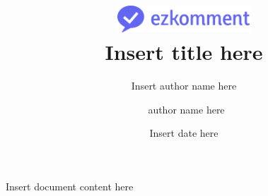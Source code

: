 \documentclass[11pt]{article}
\title{\includegraphics[height=1cm]{ezkomment.pdf}\\[1cm]\bfseries Insert title here}
\author{Insert author name here \and\ author name here}
\date{Insert date here}
\begin{document}
\maketitle
\tableofcontents
\setlength\parindent{0pt}
\setlength\parskip{1em}
\begin{markdown}
Insert document content here
\end{markdown}
\end{document}
